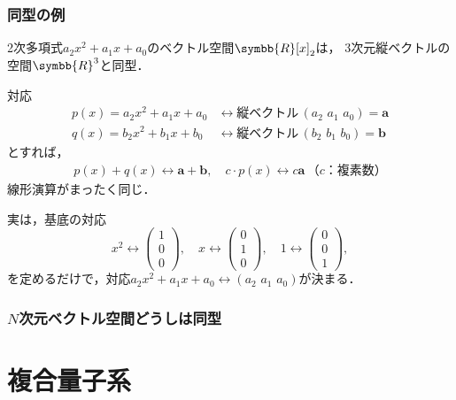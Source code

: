 \documentclass[
    10pt,
    ]{sotsu-beamer}
\begin{document}
\begin{frame}[allowframebreaks]
    \frametitle{同型の例}

    2次多項式$a_2 x^2 + a_1 x + a_0$のベクトル空間$\symbb{R}[x]_2$は，
    3次元縦ベクトルの空間$\symbb{R}^3$と同型．

    対応
    \begin{align*}
        p(x) = a_2 x^2 + a_1 x + a_0
        &\leftrightarrow \text{縦ベクトル} \, (a_2 \,\, a_1 \,\, a_0) = \symbf{a}
        \\
        q(x) = b_2 x^2 + b_1 x + b_0
        &\leftrightarrow \text{縦ベクトル} \, (b_2 \,\, b_1 \,\, b_0) = \symbf{b}
    \end{align*}
    とすれば，
    \begin{align*}
        p(x) + q(x) \leftrightarrow \symbf{a} + \symbf{b},
        \quad
        c \cdotp p(x) \leftrightarrow c \symbf{a} \, \text{（$c$：複素数）}
    \end{align*}
    線形演算がまったく同じ．


    \framebreak

    実は，基底の対応
    \begin{equation*}
        x^2 \leftrightarrow \begin{pmatrix} 1 \\ 0 \\ 0 \end{pmatrix},
        \quad 
        x \leftrightarrow \begin{pmatrix} 0 \\ 1 \\ 0 \end{pmatrix},
        \quad 
        1 \leftrightarrow \begin{pmatrix} 0 \\ 0 \\ 1 \end{pmatrix},
    \end{equation*}
    を定めるだけで，対応$a_2 x^2 + a_1 x + a_0 \leftrightarrow (a_2 \,\, a_1 \,\, a_0)$が決まる．

\end{frame}


\begin{frame}
    \frametitle{$N$次元ベクトル空間どうしは同型}

    

\end{frame}



\section{複合量子系}
\end{document}
